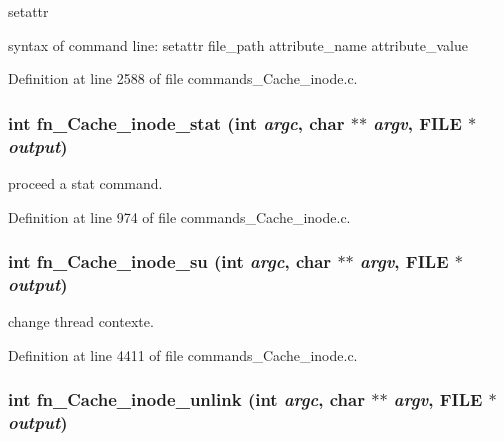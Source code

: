 setattr

syntax of command line: setattr file\_\-path attribute\_\-name attribute\_\-value 

Definition at line 2588 of file commands\_\-Cache\_\-inode.c.
\subsubsection[{fn\_\-Cache\_\-inode\_\-stat}]{\setlength{\rightskip}{0pt plus 5cm}int fn\_\-Cache\_\-inode\_\-stat (int {\em argc}, \/  char $\ast$$\ast$ {\em argv}, \/  FILE $\ast$ {\em output})}\label{commands__Cache__inode_8c_4cd5ca6eb69f06e858fc1ff59837dcce}


proceed a stat command. 

Definition at line 974 of file commands\_\-Cache\_\-inode.c.
\subsubsection[{fn\_\-Cache\_\-inode\_\-su}]{\setlength{\rightskip}{0pt plus 5cm}int fn\_\-Cache\_\-inode\_\-su (int {\em argc}, \/  char $\ast$$\ast$ {\em argv}, \/  FILE $\ast$ {\em output})}\label{commands__Cache__inode_8c_e03b408b9dc4ff37949b4b761be07a08}


change thread contexte. 

Definition at line 4411 of file commands\_\-Cache\_\-inode.c.
\subsubsection[{fn\_\-Cache\_\-inode\_\-unlink}]{\setlength{\rightskip}{0pt plus 5cm}int fn\_\-Cache\_\-inode\_\-unlink (int {\em argc}, \/  char $\ast$$\ast$ {\em argv}, \/  FILE $\ast$ {\em output})}\label{commands__Cache__inode_8c_678890f8119b2f025a9ebea4166785a9}


